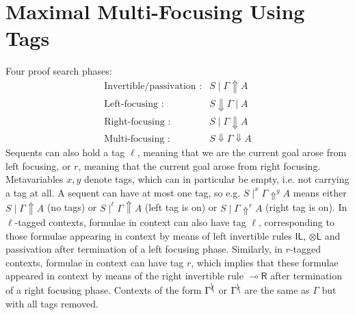 \documentclass[runningheads]{llncs}
\renewcommand{\vec}{\overrightarrow}
\newcommand{\tl}{\otimes \mathsf{L}}
\newcommand{\tr}{\otimes \mathsf{R}}
\newcommand{\lright}{{\multimap}\mathsf{R}}
\newcommand{\lleft}{{\multimap}\mathsf{L}}
\newcommand{\unitl}{\mathsf{IL}}
\newcommand{\otL}{\tl}
\newcommand{\otR}{\tr}
\newcommand{\lolliR}{\lright}
\newcommand{\lolliL}{\lleft}
\newcommand{\IL}{\unitl}
\newcommand{\ot}{\otimes}
\newcommand{\lolli}{\multimap}
\newcommand{\up}{\Uparrow}
\newcommand{\dn}{\Downarrow}
\newcommand{\focL}{\mathsf{foc_L}}
\newcommand{\foc}{\mathsf{foc}}
\newcommand{\blurL}{\mathsf{blur_L}}
\newcommand{\unfoc}{\mathsf{unfoc}}
\begin{document}

\section{Maximal Multi-Focusing Using Tags}\label{sec:maxfocus}

Four proof search phases:
\[
\begin{array}{rl}
  \text{Invertible/passivation :} &  S \mid \Gamma \up A \\
  \text{Left-focusing :} &  S \dn \Gamma \mid A \\
  \text{Right-focusing :} &  S \mid \Gamma \dn A \\
  \text{Multi-focusing :} &  S \dn \Gamma \dn A
\end{array}
\]
Sequents can also hold a tag $\ell$, meaning that we are the current goal arose from left focusing, or $r$, meaning that the current goal arose from right focusing. Metavariables $x,y$  denote tags, which can in particular be empty, i.e. not carrying a tag at all. A sequent can have at most one tag, so e.g. $S \mid^x \Gamma \up^y A$ means either $S \mid \Gamma \up A$ (no tags) or $S \mid^\ell \Gamma \up A$ (left tag is on) or $S \mid \Gamma \up^r A$ (right tag is on). In $\ell$-tagged contexts, formulae in context can also have tag $\ell$, corresponding to those formulae appearing in context by means of left invertible rules $\IL$, $\otL$ and passivation after termination of a left focusing phase. Similarly, in $r$-tagged contexts, formulae in context can have tag $r$, which implies that these formulae appeared in context by means of the right invertible rule $\lolliR$ after termination of a right focusing phase. Contexts of the form $\Gamma^{\bcancel{\ell}}$ or $\Gamma^{\bcancel{r}}$ are the same as $\Gamma$ but with all tags removed.
\end{document}
